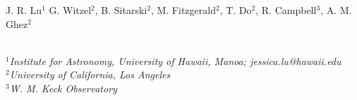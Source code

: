 J. R. Lu${}^1$
G. Witzel${}^2$,
B. Sitarski${}^2$,
M. Fitzgerald${}^2$,
T. Do${}^2$,
R. Campbell${}^3$,
A. M. Ghez${}^2$

\\
{\em ${}^1$Institute for Astronomy, University of Hawaii, Manoa;
jessica.lu@hawaii.edu}
\\
{\em ${}^2$University of California, Los Angeles}
\\
{\em ${}^3$W. M. Keck Observatory}
